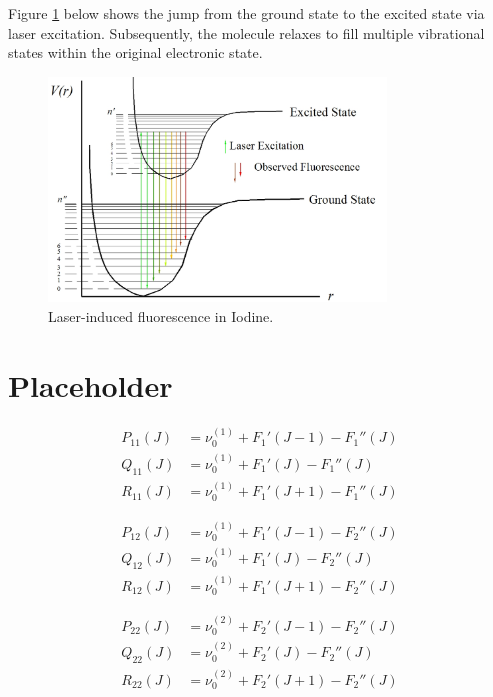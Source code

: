 \documentclass[11pt, twoside, fleqn]{report}
\begin{document}
Figure \ref{f:laser-induced_fluorescence_in_iodine} below shows the jump from the ground state to the excited state via laser excitation. Subsequently, the molecule relaxes to fill multiple vibrational states within the original electronic state.

\begin{figure}[H]
    \centering
    \includegraphics[width=0.8\textwidth]{img/lif_bands.jpg}
    \caption{Laser-induced fluorescence in Iodine.}
    \label{f:laser-induced_fluorescence_in_iodine}
\end{figure}

\chapter{Placeholder}

\begin{align*}
    P_{11}(J) &= \nu_0^{(1)} + F_1'(J - 1) - F_1''(J) \\
    Q_{11}(J) &= \nu_0^{(1)} + F_1'(J) - F_1''(J) \\
    R_{11}(J) &= \nu_0^{(1)} + F_1'(J + 1) - F_1''(J)
\end{align*}

\begin{align*}
    P_{12}(J) &= \nu_0^{(1)} + F_1'(J - 1) - F_2''(J) \\
    Q_{12}(J) &= \nu_0^{(1)} + F_1'(J) - F_2''(J) \\
    R_{12}(J) &= \nu_0^{(1)} + F_1'(J + 1) - F_2''(J)
\end{align*}

\begin{align*}
    P_{22}(J) &= \nu_0^{(2)} + F_2'(J - 1) - F_2''(J) \\
    Q_{22}(J) &= \nu_0^{(2)} + F_2'(J) - F_2''(J) \\
    R_{22}(J) &= \nu_0^{(2)} + F_2'(J + 1) - F_2''(J)
\end{align*}
\end{document}
